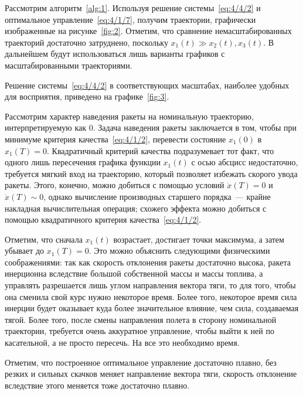 
Рассмотрим алгоритм~\vref{alg:1}. Используя решение системы~\ref{eq:4/4/2} и оптимальное управление~\ref{eq:4/1/7}, получим траектории, графически изображенные на рисунке~\ref{fig:2}. Отметим, что сравнение немасштабированных траекторий достаточно затруднено, поскольку $x_1(t) \gg x_2(t), x_3(t)$. В дальнейшем будут использоваться лишь варианты графиков с масштабированными траекториями.


Решение системы~\ref{eq:4/4/2} в соответствующих масштабах, наиболее удобных для восприятия, приведено на графике~\ref{fig:3}.

\br

Рассмотрим характер наведения ракеты на номинальную траекторию, интерпретируемую как $0$. Задача наведения ракеты заключается в том, чтобы при минимуме критерия качества~\ref{eq:4/1/2}, перевести состояние $x_1(0)$ в $x_1(T)=0$. Квадратичный критерий качества подразумевает тот факт, что одного лишь пересечения графика функции $x_1(t)$ с осью абсцисс недостаточно, требуется мягкий вход на траекторию, который позволяет избежать скорого увода ракеты. Этого, конечно, можно добиться с помощью условий $\dot{x}(T)=0$ и $\ddot{x}(T) \sim 0$, однако вычисление производных старшего порядка~--- крайне накладная вычислительная операция; схожего эффекта\cite{XU} можно добиться с помощью квадратичного критерия качества~\ref{eq:4/1/2}.

Отметим, что сначала $x_1(t)$ возрастает, достигает точки максимума, а затем убывает до $x_1(T)=0$. Это можно объяснить следующими физическими соображениями: так как скорость отклонения ракеты достаточно высока, ракета инерционна вследствие большой собственной массы и массы топлива, а управлять разрешается лишь углом направления вектора тяги, то для того, чтобы она сменила свой курс нужно некоторое время. Более того, некоторое время сила инерции будет оказывает куда более значительное влияние, чем сила, создаваемая тягой. Более того, после смены направления полета в сторону номинальной траектории, требуется очень аккуратное управление, чтобы выйти к ней по касательной, а не просто пересечь. На все это необходимо время.

Отметим, что построенное оптимальное управление достаточно плавно, без резких и сильных скачков меняет направление вектора тяги, скорость отклонение вследствие этого меняется тоже достаточно плавно.

